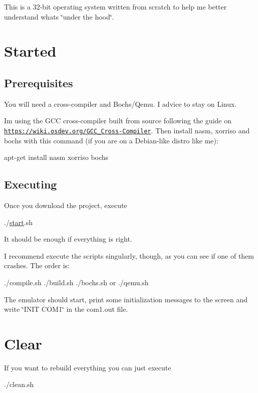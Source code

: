 This is a 32-\/bit operating system written from scratch to help me better understand what\textquotesingle{}s \char`\"{}under the hood\char`\"{}.\hypertarget{index_Getting}{}\section{Started}\label{index_Getting}
\hypertarget{index_Prerequisites}{}\subsection{Prerequisites}\label{index_Prerequisites}
You will need a cross-\/compiler and Bochs/\+Qemu. I advice to stay on Linux.

I\textquotesingle{}m using the G\+CC cross-\/compiler built from source following the guide on \href{https://wiki.osdev.org/GCC_Cross-Compiler}{\tt https\+://wiki.\+osdev.\+org/\+G\+C\+C\+\_\+\+Cross-\/\+Compiler}. Then install {\ttfamily nasm}, {\ttfamily xorriso} and {\ttfamily bochs} with this command (if you are on a Debian-\/like distro like me)\+: 
\begin{DoxyCode}
apt-\textcolor{keyword}{get} install nasm xorriso bochs
\end{DoxyCode}
\hypertarget{index_Executing}{}\subsection{Executing}\label{index_Executing}
Once you download the project, execute 
\begin{DoxyCode}
./\hyperlink{pmm_8h_ad56f39f054765ea9dd480006512069cf}{start}.sh
\end{DoxyCode}
 It should be enough if everything is right.

I recommend execute the scripts singularly, though, as you can see if one of them crashes. The order is\+: 
\begin{DoxyCode}
./compile.sh
./build.sh
./bochs.sh  or ./qemu.sh
\end{DoxyCode}


The emulator should start, print some initialization messages to the screen and write \char`\"{}\+I\+N\+I\+T C\+O\+M1\char`\"{} in the com1.\+out file.\hypertarget{index_Clear}{}\section{Clear}\label{index_Clear}
If you want to rebuild everything you can just execute 
\begin{DoxyCode}
./clean.sh
\end{DoxyCode}


